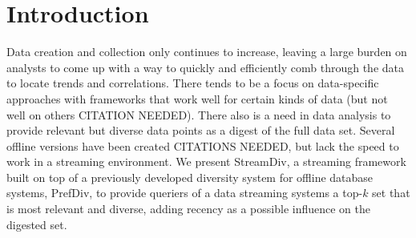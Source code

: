 \section{Introduction}

Data creation and collection only continues to increase, leaving a large burden on analysts to come up with a way to quickly and efficiently comb through the data to locate trends and correlations.  There tends to be a focus on data-specific approaches with frameworks that work well for certain kinds of data (but not well on others CITATION NEEDED).  There also is a need in data analysis to provide relevant but diverse data points as a digest of the full data set.  Several offline versions have been created \cite{Ge:2015:PD:2795218.2795224} CITATIONS NEEDED, but lack the speed to work in a streaming environment.  We present StreamDiv, a streaming framework built on top of a previously developed diversity system for offline database systems, PrefDiv\cite{Ge:2015:PD:2795218.2795224}, to provide queriers of a data streaming systems a top-$k$ set that is most relevant and diverse, adding recency as a possible influence on the digested set.